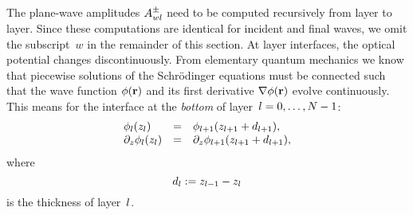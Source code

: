 The plane-wave amplitudes $A^\pm_{wl}$ need to be computed recursively
from layer to layer.
Since these computations are identical for incident and final waves,
we omit the subscript~$w$ in the remainder of this section.
At layer interfaces, the optical potential changes discontinuously.
From elementary quantum mechanics we know that
piecewise solutions of the Schrödinger equations must be connected
such that the wave function $\phi(\mathbf{r})$ and its first derivative
$\mathbf{\nabla}\phi(\mathbf{r})$ evolve continuously.
This means for the interface
at the \textit{bottom} of layer~$l=0,\ldots,N-1$:%
\begin{equation}\label{Econtcond}
  \begin{array}{lcl}
            \phi_l(z_l)&=&\phi_{l+1}(z_{l+1}+d_{l+1}),\\
            \partial_z\phi_l(z_l)&=&\partial_z\phi_{l+1}(z_{l+1}+d_{l+1}),
  \end{array}
\end{equation}
  where
\begin{equation}
  d_l:=z_{l-1}-z_{l}
\end{equation}
is the thickness of layer~$l$.

